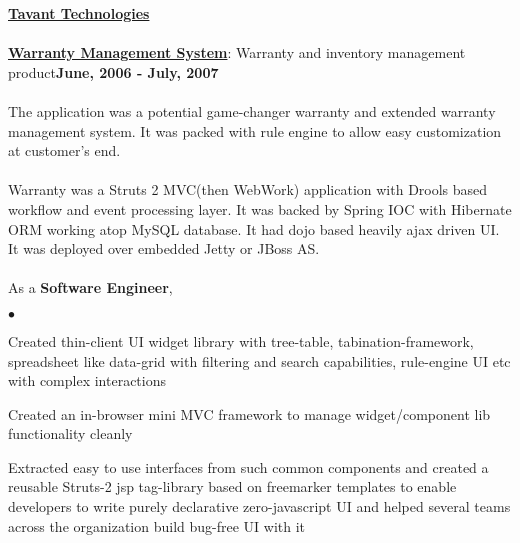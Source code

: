 \documentclass[margin,line]{res}
\newenvironment{list2}{
  \begin{list}{$\bullet$}{%
      \setlength{\itemsep}{0in}
      \setlength{\parsep}{0in} \setlength{\parskip}{0in}
      \setlength{\topsep}{0in} \setlength{\partopsep}{0in} 
      \setlength{\leftmargin}{0.2in}}}{\end{list}}
\begin{document}
\begin{resume}
{\underline {\bf Tavant Technologies}}\\
\\
\href{http://www.tavant.com/warranty-management}{\bf Warranty Management System}: Warranty and inventory management product\hfill {\bf June, 2006 - July, 2007}\\
\vspace{-.2cm}\\
The application was a potential game-changer warranty and extended warranty management system. It was packed with rule engine to allow easy customization at customer's end.\\
\\
Warranty was a Struts 2 MVC(then WebWork) application with Drools based workflow and event processing layer. It was backed by Spring IOC with Hibernate ORM working atop MySQL database. It had dojo based heavily ajax driven UI. It was deployed over embedded Jetty or JBoss AS.\\
\\
As a {\bf Software Engineer},
\begin{list2}
\item Created thin-client UI widget library with tree-table, tabination-framework, spreadsheet like data-grid with filtering and search capabilities, rule-engine UI etc with complex interactions
\item Created an in-browser mini MVC framework to manage widget/component lib functionality cleanly
\item Extracted easy to use interfaces from such common components and created a reusable Struts-2 jsp tag-library based on freemarker templates to enable developers to write purely declarative zero-javascript UI and helped several teams across the organization build bug-free UI with it
\end{list2}


\end{resume}
\end{document}
